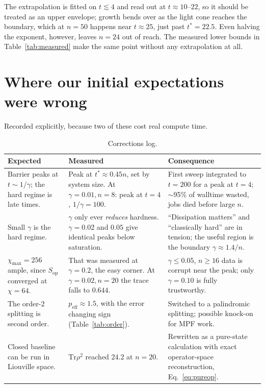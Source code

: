 \documentclass[11pt,a4paper]{article}
\newcommand{\Sop}{S_{\mathrm{op}}}
\begin{document}
The extrapolation is fitted on $t\lesssim4$ and read out at $t\approx10$--$22$,
so it should be treated as an upper envelope; growth bends over as the light
cone reaches the boundary, which at $n=50$ happens near $t\approx25$, just past
$t^\ast=22.5$. Even halving the exponent, however, leaves $n=24$ out of reach.
The measured lower bounds in Table~\ref{tab:measured} make the same point
without any extrapolation at all.

\section{Where our initial expectations were wrong}
\label{sec:wrong}

Recorded explicitly, because two of these cost real compute time.

\begin{table}[htbp]
\centering
\caption{Corrections log.}
\begin{tabular}{p{}p{}p{}}
\toprule
\textbf{Expected} & \textbf{Measured} & \textbf{Consequence} \\
\midrule
Barrier peaks at $t\sim1/\gamma$; the hard regime is late times.
& Peak at $t^\ast\approx0.45n$, set by system size. At $\gamma=0.01,n=8$: peak at $t=4$, $1/\gamma=100$.
& First sweep integrated to $t=200$ for a peak at $t=4$; $\sim$95\% of walltime wasted, jobs died before large $n$. \\
\addlinespace
Small $\gamma$ is the hard regime.
& $\gamma$ only ever \emph{reduces} hardness. $\gamma=0.02$ and $0.05$ give identical peaks below saturation.
& ``Dissipation matters'' and ``classically hard'' are in tension; the useful region is the boundary $\gamma\approx1.4/n$. \\
\addlinespace
$\chi_{\max}=256$ ample, since $\Sop$ converged at $\chi=64$.
& That was measured at $\gamma=0.2$, the easy corner. At $\gamma=0.02,n=20$ the trace falls to $0.644$.
& $\gamma\le0.05$, $n\ge16$ data is corrupt near the peak; only $\gamma=0.10$ is fully trustworthy. \\
\addlinespace
The order-2 splitting is second order.
& $p_{\mathrm{eff}}\approx1.5$, with the error changing sign (Table~\ref{tab:order}).
& Switched to a palindromic splitting; possible knock-on for MPF work. \\
\addlinespace
Closed baseline can be run in Liouville space.
& $\mathrm{Tr}\rho^2$ reached 24.2 at $n=20$.
& Rewritten as a pure-state calculation with exact operator-space reconstruction, Eq.~\eqref{eq:pureop}. \\
\bottomrule
\end{tabular}
\end{table}
\end{document}
